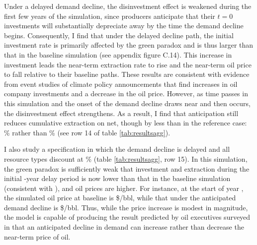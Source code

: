 \documentclass[12pt]{article}
\begin{document}
Under a delayed demand decline, the disinvestment effect is weakened during the first few years of the simulation, since producers anticipate that their $t=0$ investments will substantially depreciate away by the time the demand decline begins. Consequently, I find that under the delayed decline path, the initial investment rate is primarily affected by the green paradox and is thus larger than that in the baseline simulation (see appendix figure C.14). This increase in investment leads the near-term extraction rate to rise and the near-term oil price to fall relative to their baseline paths. These results are consistent with evidence from event studies of climate policy announcements \citep{adolfsenetal2024,normanschlenker2024} that find increases in oil company investments and a decrease in the oil price. However, as time passes in this simulation and the onset of the demand decline draws near and then occurs, the disinvestment effect strengthens. As a result, I find that anticipation still reduces cumulative extraction on net, though by less than in the reference case: \unskip\% rather than \unskip\% (see row 14 of table \ref{tab:resultsagg}).

I also study a specification in which the demand decline is delayed and all resource types discount at \unskip\% (table \ref{tab:resultsagg}, row 15). In this simulation, the green paradox is sufficiently weak that investment and extraction during the initial \unskip-year delay period is now lower than that in the baseline simulation (consistent with \cite{bogmansetal2023}), and oil prices are higher. For instance, at the start of year \unskip, the simulated oil price at baseline is \$\unskip/bbl, while that under the anticipated demand decline is \$\unskip/bbl. Thus, while the price increase is modest in magnitude, the model is capable of producing the result predicted by oil executives surveyed in \cite{dallasfed} that an anticipated decline in demand can increase rather than decrease the near-term price of oil.
\end{document}

